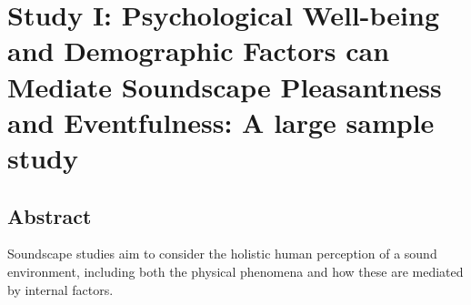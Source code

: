\chapter[Study I: Personal Factors]{Study I: Psychological Well-being and Demographic Factors can Mediate Soundscape Pleasantness and Eventfulness: A large sample study}


\section*{Abstract}

 Soundscape studies aim to consider the holistic human perception of a sound environment, including both the physical phenomena and how these are mediated by internal factors.